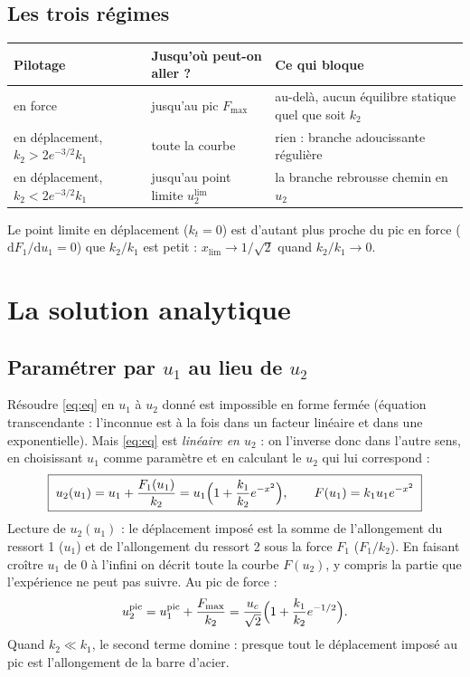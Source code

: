 \documentclass[11pt,a4paper]{article}
\newcommand{\dd}{\mathrm{d}}
\newcommand{\uc}{u_c}
\begin{document}
\subsection{Les trois régimes}
\begin{center}
\begin{tabular}{@{}lll@{}}
\toprule
Pilotage & Jusqu'où peut-on aller ? & Ce qui bloque\\
\midrule
en force & jusqu'au pic $F_{\max}$ & au-delà, aucun équilibre statique quel que soit $k_2$\\
en déplacement, $k_2 > 2e^{-3/2}k_1$ & toute la courbe & rien : branche adoucissante régulière\\
en déplacement, $k_2 < 2e^{-3/2}k_1$ & jusqu'au point limite $u_2^{\lim}$ & la branche rebrousse chemin en $u_2$\\
\bottomrule
\end{tabular}
\end{center}
Le point limite en déplacement ($k_t = 0$) est d'autant plus proche du pic en force
($\dd F_1/\dd u_1 = 0$) que $k_2/k_1$ est petit : $x_{\lim}\to1/\sqrt2$ quand $k_2/k_1\to0$.

\section{La solution analytique}

\subsection{Paramétrer par $u_1$ au lieu de $u_2$}
Résoudre \eqref{eq:eq} en $u_1$ à $u_2$ donné est impossible en forme fermée (équation
transcendante : l'inconnue est à la fois dans un facteur linéaire et dans une exponentielle).
Mais \eqref{eq:eq} est \emph{linéaire en $u_2$} : on l'inverse donc dans l'autre sens, en
choisissant $u_1$ comme paramètre et en calculant le $u_2$ qui lui correspond :
\begin{equation}
  \boxed{\;u_2(u_1) = u_1 + \frac{F_1(u_1)}{k_2} = u_1\Bigl(1+\frac{k_1}{k_2}e^{-x^2}\Bigr),\qquad
  F(u_1) = k_1u_1e^{-x^2}\;}
  \label{eq:ana}
\end{equation}
Lecture de $u_2(u_1)$ : le déplacement imposé est la somme de l'allongement du ressort 1 ($u_1$)
et de l'allongement du ressort 2 sous la force $F_1$ ($F_1/k_2$). En faisant croître $u_1$ de 0
à l'infini on décrit toute la courbe $F(u_2)$, y compris la partie que l'expérience ne peut pas
suivre. Au pic de force :
\begin{equation}
  u_2^{\text{pic}} = u_1^{\text{pic}} + \frac{F_{\max}}{k_2}
  = \frac{\uc}{\sqrt2}\Bigl(1+\frac{k_1}{k_2}e^{-1/2}\Bigr).
\end{equation}
Quand $k_2 \ll k_1$, le second terme domine : presque tout le déplacement imposé au pic est
l'allongement de la barre d'acier.
\end{document}
